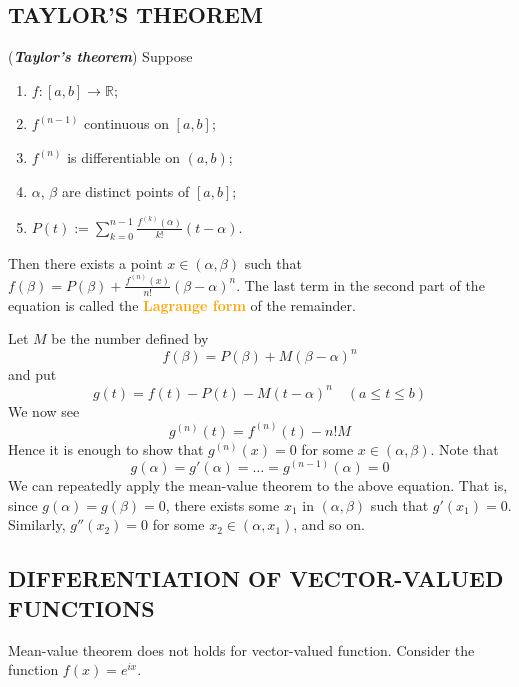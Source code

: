 \subsection{TAYLOR'S THEOREM}

\begin{theorem}
(\textbf{\emph{Taylor's theorem}}) Suppose
\begin{enumerate}[label={(\alph*)}]
\item $f:[a,b]\to \mathbb{R}$;
\item $f^{(n-1)}$ continuous on $[a,b]$;
\item $f^{(n)}$ is differentiable on $(a,b)$;
\item $\alpha$, $\beta$ are distinct points of $[a,b]$;
\item $\displaystyle P(t):=\sum_{k=0}^{n-1}\frac{f^{(k)}(\alpha)}{k!}(t-\alpha)$.
\end{enumerate}
Then there exists a point $x\in (\alpha, \beta)$ such that $\displaystyle f(\beta)=P(\beta)+\frac{f^{(n)}(x)}{n!}(\beta - \alpha)^n$. The last term in the second part of the equation is called the \textbf{\textcolor{orange}{Lagrange form}} of the remainder.
\end{theorem}
\begin{hardproof}
Let $M$ be the number defined by
$$f(\beta)=P(\beta)+M(\beta-\alpha)^n$$
and put
$$g(t) = f(t)- P(t) -M(t-\alpha)^n\quad (a\leq t\leq b)$$
We now see
$$g^{(n)}(t)=f^{(n)}(t)-n!M$$
Hence it is enough to show that $g^{(n)}(x)=0$ for some $x\in (\alpha, \beta)$.
Note that
$$g(\alpha)=g'(\alpha)=\dots=g^{(n-1)}(\alpha)=0$$
We can repeatedly apply the mean-value theorem to the above equation.
That is, since $g(\alpha)=g(\beta)=0$, there exists some $x_1$ in $(\alpha, \beta)$ such that $g'(x_1)=0$. Similarly, $g''(x_2)=0$ for some $x_2\in (\alpha, x_1)$, and so on.
\end{hardproof}

\subsection{DIFFERENTIATION OF VECTOR-VALUED FUNCTIONS}

\begin{remark}
Mean-value theorem does not holds for vector-valued function. Consider the function $f(x)=e^{ix}$.
\end{remark}

